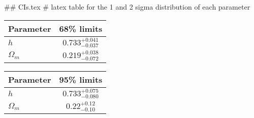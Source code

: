## CIs.tex
# latex table for the 1 and 2 sigma distribution of each parameter

\begin{tabular} { l  c}
 Parameter &  68\% limits\\
\hline
{\boldmath$h              $} & $0.733^{+0.041}_{-0.037}   $\\
{\boldmath$\Omega_m       $} & $0.219^{+0.038}_{-0.072}   $\\
\hline
\end{tabular}

\begin{tabular} { l  c}
 Parameter &  95\% limits\\
\hline
{\boldmath$h              $} & $0.733^{+0.075}_{-0.080}   $\\
{\boldmath$\Omega_m       $} & $0.22^{+0.12}_{-0.10}      $\\
\hline
\end{tabular}
